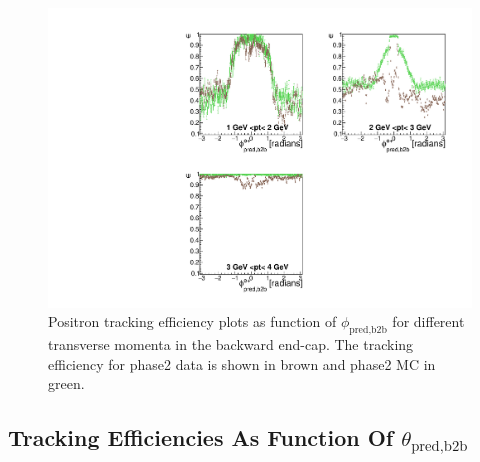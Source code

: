 \documentclass[a4paper,11pt,twosided,final,german,openbib,pdftex,listof=totoc,bibliography=totoc]{scrbook}
\begin{document}
\begin{figure}[!htbp]
	\centering
	\includegraphics[width=\textwidth]{Plots/master/xPtMPhiepEC}
	\caption[Transverse Momentum $\phi_{\textrm{pred,b2b}}$ Positron Backward End-Cap Efficiency Phase2]{Positron tracking efficiency plots as function of $\phi_{\textrm{pred,b2b}}$ for different transverse momenta in the backward end-cap. The tracking efficiency for phase2 data is shown in brown and phase2 MC in green.
		\label{plt:xPtMPhiepEC}	}
\end{figure}

\newpage

\subsection{Tracking Efficiencies As Function Of $\theta_{\textrm{pred,b2b}}$}
\end{document}
